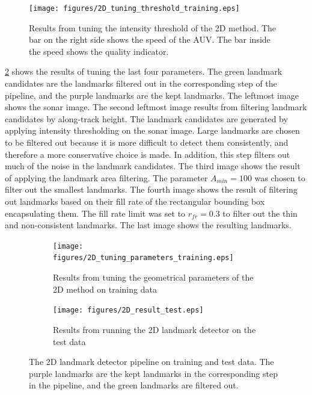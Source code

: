 \begin{figure}  %
  \centering
  \texttt{[image: figures/2D\_tuning\_threshold\_training.eps]}
  \caption[Results of tuning intensity threshold the 2D method]{Results from tuning the intensity threshold of the 2D method. The bar on the right side shows the speed of the AUV. The bar inside the speed shows the quality indicator. }
  \label{fig:2D_tuning_intensity_thres}
\end{figure}

\cref{fig:2d_tuning_paramaters_training} shows the results of tuning the last four parameters. The green landmark candidates are the landmarks filtered out in the corresponding step of the pipeline, and the purple landmarks are the kept landmarks. The leftmost image shows the sonar image. The second leftmost image results from filtering landmark candidates by along-track height. The landmark candidates are generated by applying intensity thresholding on the sonar image. Large landmarks are chosen to be filtered out because it is more difficult to detect them consistently, and therefore a more conservative choice is made. In addition, this step filters out much of the noise in the landmark candidates. The third image shows the result of applying the landmark area filtering. The parameter $A_{min} = 100$ was chosen to filter out the smallest landmarks. The fourth image shows the result of filtering out landmarks based on their fill rate of the rectangular bounding box encapsulating them. The fill rate limit was set to $r_{fr} = 0.3$ to filter out the thin and non-consistent landmarks. The last image shows the resulting landmarks.

\newpage

\begin{figure} [h!] %
     \centering
     \begin{subfigure}[bh]{0.59\textwidth}
         \centering
         \texttt{[image: figures/2D\_tuning\_parameters\_training.eps]}
         \caption[Results of tuning the geometrical thresholds 2D method]{Results from tuning the geometrical parameters of the 2D method on training data}
         \label{fig:2d_tuning_paramaters_training}
     \end{subfigure}
     \hfill
     \begin{subfigure}[bh]{0.395\textwidth}
         \centering
         \texttt{[image: figures/2D\_result\_test.eps]}
         \caption[Results from testing the 2D landmark detector]{Results from running the 2D landmark detector on the test data}
         \label{fig:2d_result_test}
     \end{subfigure}
     \caption{The 2D landmark detector pipeline on training and test data. The purple landmarks are the kept landmarks in the corresponding step in the pipeline, and the green landmarks are filtered out.}
\end{figure}

